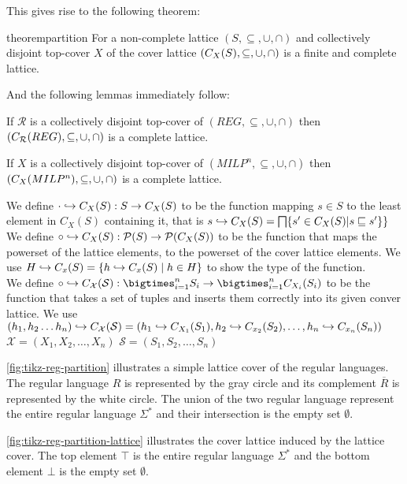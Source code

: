 This gives rise to the following theorem:

\begin{restatable}{theorem}{partition}\label{thm:partition}
    For a non-complete lattice $(S, \subseteq, \cup, \cap)$ and collectively disjoint top-cover $X$ of the cover lattice $(C_{X}(S), \subseteq, \cup, \cap)$ is a finite and complete lattice.
\end{restatable}

And the following lemmas immediately follow:

\begin{lemma}
    If $\mathcal{R}$ is a collectively disjoint top-cover of $(REG, \subseteq, \cup, \cap)$ then $(C_{\mathcal{R}}(REG), \subseteq, \cup, \cap)$ is a complete lattice.
\end{lemma}

\begin{lemma}
    If $X$ is a collectively disjoint top-cover of $(MILP^n, \subseteq, \cup, \cap)$ then $(C_{X}(MILP^n), \subseteq, \cup, \cap)$ is a complete lattice.
\end{lemma}

\begin{definition}
    We define $\cdot \hookrightarrow C_X(S):S\rightarrow C_X(S)$ to be the function mapping $s\in S$ to the least element in $C_X(S)$ containing it, that is $s \into C_X(S)=\bigsqcap\{s'\in C_X(S)|s\sqsubseteq s'\}\}$
    \\
    
    We define $\circ \hookrightarrow C_X(S):\mathcal{P}(S)\rightarrow \mathcal{P}(C_X(S))$ to be the function that maps the powerset of the lattice elements, to the powerset of the cover lattice elements.
    We use $H \hookrightarrow C_x (S) = \{h \hookrightarrow C_x (S) \mid h \in H\}$ to show the type of the function.
    \\
    We define $\circ \into C_\mathcal{X}(\mathcal{S}): \bigtimes_{i = 1}^{n} S_i \rightarrow \bigtimes_{i = 1}^{n} C_{X_i}(S_i)$ to be the function that takes a set of tuples and inserts them correctly into its given conver lattice.
    We use $(h_1, h_2 \dots h_n)\hookrightarrow C_{\mathcal{X}}(\mathcal{S})=(h_1 \hookrightarrow C_{X_1}(S_1), h_2\hookrightarrow C_{x_2}(S_2), \dots, h_n \hookrightarrow C_{x_n}(S_n))$
    $\mathcal{X}=(X_1, X_2, \dots, X_n)$
    $\mathcal{S}=(S_1, S_2, \dots, S_n)$
\end{definition}

\begin{example}
    \autoref{fig:tikz-reg-partition} illustrates a simple lattice cover of the regular languages. The regular language $R$ is represented by the gray circle and its complement $\overline{R}$ is represented by the white circle. The union of the two regular language represent the entire regular language $\Sigma^*$ and their intersection is the empty set $\emptyset$.

    \autoref{fig:tikz-reg-partition-lattice} illustrates the cover lattice induced by the lattice cover. The top element $\top$ is the entire regular language $\Sigma^*$ and the bottom element $\bot$ is the empty set $\emptyset$.
\end{example}

